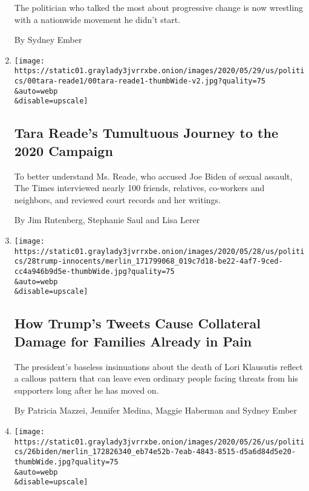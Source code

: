 \begin{enumerate}
  The politician who talked the most about progressive change is now
  wrestling with a nationwide movement he didn't start.

  By Sydney Ember
\item
  \href{/2020/05/31/us/politics/tara-reade-joe-biden.html}{}

  \texttt{[image: https://static01.graylady3jvrrxbe.onion/images/2020/05/29/us/politics/00tara-reade1/00tara-reade1-thumbWide-v2.jpg?quality=75\\\&auto=webp\\\&disable=upscale]}

  \hypertarget{tara-reades-tumultuous-journey-to-the-2020-campaign}{%
  \subsection{Tara Reade's Tumultuous Journey to the 2020
  Campaign}\label{tara-reades-tumultuous-journey-to-the-2020-campaign}}

  To better understand Ms. Reade, who accused Joe Biden of sexual
  assault, The Times interviewed nearly 100 friends, relatives,
  co-workers and neighbors, and reviewed court records and her writings.

  By Jim Rutenberg, Stephanie Saul and Lisa Lerer
\item
  \href{/2020/05/29/us/politics/trump-scarborough-klausutis.html}{}

  \texttt{[image: https://static01.graylady3jvrrxbe.onion/images/2020/05/28/us/politics/28trump-innocents/merlin\_171799068\_019c7d18-be22-4af7-9ced-cc4a946b9d5e-thumbWide.jpg?quality=75\\\&auto=webp\\\&disable=upscale]}

  \hypertarget{how-trumps-tweets-cause-collateral-damage-for-families-already-in-pain}{%
  \subsection{How Trump's Tweets Cause Collateral Damage for Families
  Already in
  Pain}\label{how-trumps-tweets-cause-collateral-damage-for-families-already-in-pain}}

  The president's baseless insinuations about the death of Lori
  Klausutis reflect a callous pattern that can leave even ordinary
  people facing threats from his supporters long after he has moved on.

  By Patricia Mazzei, Jennifer Medina, Maggie Haberman and Sydney Ember
\item
  \href{/2020/05/26/us/politics/joe-biden-facemasks-trump-coronavirus.html}{}

  \texttt{[image: https://static01.graylady3jvrrxbe.onion/images/2020/05/26/us/politics/26biden/merlin\_172826340\_eb74e52b-7eab-4843-8515-d5a6d84d5e20-thumbWide.jpg?quality=75\\\&auto=webp\\\&disable=upscale]}


\end{enumerate}
